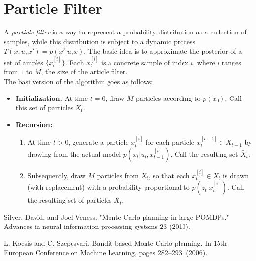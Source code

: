 \documentclass[a4paper,10pt]{article}
\begin{document}
\section{Particle Filter}
A \emph{particle filter} is a way to represent a probability distribution as a collection of samples, while this distribution is subject to a dynamic process $T(x, u, x') = p(x' | u, x)$. The basic idea is to approximate the posterior of a set of amples $\{x_t^{[i]}\}$. Each $x_t^{[i]}$ is a concrete sample of index $i$, where $i$ ranges from $1$ to $M$, the size of the article filter.\\
The basi version of the algorithm goes as follows:
\begin{itemize}
    \item \textbf{Initialization:} At time $t=0$, draw $M$ particles according to $p(x_0)$. Call this set of particles $X_0$.
    \item \textbf{Recursion:} 
    \begin{enumerate}
        \item At time $t>0$, generate a particle $x_t^{[i]}$ for each particle $x_t^{[i-1]} \in X_{t-1}$ by drawing from the actual model $p(x_t | u_t, x_{t-1}^{[i]})$. Call the resulting set $\bar X_t$.
        \item Subsequently, draw $M$ particles from $\bar X_t$, so that each $x_t^{[i]} \in \bar X_{t}$ is drawn (with replacement) with a probability proportional to $p(z_t | x_t^{[i]})$. Call the resulting set of particles $X_t$.
    \end{enumerate}
\end{itemize}

\begin{thebibliography}{9}
	Silver, David, and Joel Veness. "Monte-Carlo planning in large POMDPs." Advances in neural information processing systems 23 (2010).

    L. Kocsis and C. Szepesvari. Bandit based Monte-Carlo planning. In 15th European
    Conference on Machine Learning, pages 282–293, (2006).

\end{thebibliography}
\end{document}
